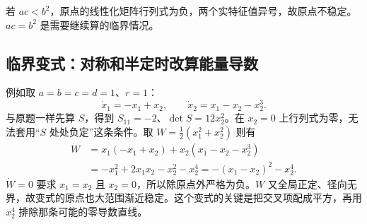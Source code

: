 若 $ac<b^2$，原点的线性化矩阵行列式为负，两个实特征值异号，故原点不稳定。$ac=b^2$ 是需要继续算的临界情况。

\subsection{临界变式：对称和半定时改算能量导数}

例如取 $a=b=c=d=1$、$r=1$：
\[
    \dot x_1=-x_1+x_2,\qquad
    \dot x_2=x_1-x_2-x_2^3 .
\]
与原题一样先算 $S$，得到 $S_{11}=-2$、$\det S=12x_2^2$。在 $x_2=0$ 上行列式为零，无法套用“$S$ 处处负定”这条条件。取 $W=\tfrac12(x_1^2+x_2^2)$ 则有
\[
\begin{aligned}
    \dot W&=x_1(-x_1+x_2)+x_2(x_1-x_2-x_2^3)\\
           &=-x_1^2+2x_1x_2-x_2^2-x_2^4
            =-(x_1-x_2)^2-x_2^4 .
\end{aligned}
\]
$\dot W=0$ 要求 $x_1=x_2$ 且 $x_2=0$，所以除原点外严格为负。$W$ 又全局正定、径向无界，故变式的原点也大范围渐近稳定。这个变式的关键是把交叉项配成平方，再用 $x_2^4$ 排除那条可能的零导数直线。

